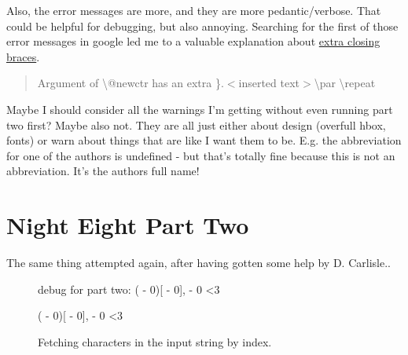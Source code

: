 \documentclass{article} \usepackage[utf8]{inputenc}
\newif\ifrunparttwotrytwo
\begin{document}
Also, the error messages are more, and they are more pedantic/verbose. That could be helpful for debugging, but also annoying.
Searching for the first of those error messages in google led me to a valuable explanation about \href{http://www.texfaq.org/FAQ-extrabrace}{extra closing braces}.

\begin{quote}
Argument of \textbackslash @newctr has an extra \}.$<$inserted text$>$\textbackslash par \textbackslash repeat
\end{quote}

Maybe I should consider all the warnings I'm getting without even running part two first? Maybe also not. They are all just either about design (overfull hbox, fonts) or warn about things that are like I want them to be. E.g. the abbreviation for one of the authors is undefined - but that's totally fine because this is not an abbreviation. It's the authors full name!

\section{Night Eight Part Two}
The same thing attempted again, after having gotten some help by D. Carlisle..

\ifrunparttwotrytwo

  \begin{figure}[hbp]
  debug for part two:
  \setcounter{debugctr}{-1}
	{\loop
	\edef\tmpinput{\the\numexpr \value{debugctr} - 0}
	\def\tmpchar{\expandafter\lucidcharat\tmpinput}
	(\tmpinput)[\tmpchar],
	\show\tmpchar
	\typeout{tmpchar is \tmpchar}
	\ifnum \value{debugctr}<3
	\repeat }
	
	\begin{mycode}
	
    \setcounter{debugctr}{-1}
	{\loop
		\edef\tmpinput{\the\numexpr \value{debugctr} - 0}
		\def\tmpchar{\expandafter\lucidcharat\tmpinput}
		(\tmpinput)[\tmpchar],
		\show\tmpchar
		\typeout{tmpchar is \tmpchar}
		\ifnum \value{debugctr}<3
		\repeat }
	\end{mycode}
  \caption{Fetching characters in the input string by index.}
  \label{fig:hardcodinglucidcharat}
  \end{figure}
  
\end{document}
